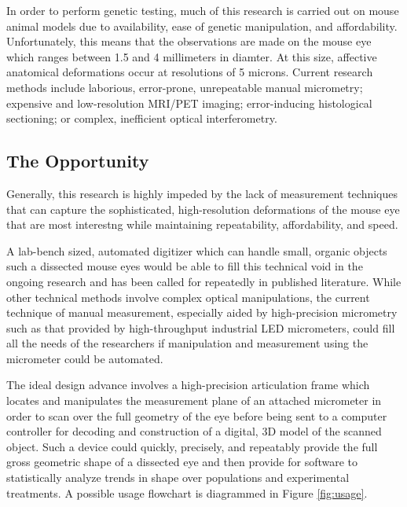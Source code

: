 \documentclass{article}
\begin{document}
In order to perform genetic testing, much of this research is carried
out on mouse animal models due to availability, ease of genetic
manipulation, and affordability\cite{schaeffel04}. Unfortunately, this
means that the observations are made on the mouse eye which ranges
between 1.5 and 4 millimeters in diamter. At this size, affective
anatomical deformations occur at resolutions of 5 microns. Current
research methods include laborious, error-prone, unrepeatable manual
micrometry\cite{wallman04}; expensive and low-resolution MRI/PET
imaging\cite{atchison04}; error-inducing histological
sectioning\cite{schaeffel04}; or complex, inefficient optical
interferometry\cite{schaeffel04,guggenheim04}.

\subsection{The Opportunity}
\label{sec:opportunity}

Generally, this research is highly impeded by the lack of measurement
techniques that can capture the sophisticated, high-resolution
deformations of the mouse eye that are most interestng while
maintaining repeatability, affordability, and speed.

A lab-bench sized, automated digitizer which can handle small, organic objects such a dissected mouse eyes would be able to fill this technical void in the ongoing research and has been called for repeatedly in published literature\cite{schaeffel04,atchison04,zhou99:genes,zhou99:models}. While other technical methods involve complex optical manipulations, the current technique of manual measurement, especially aided by high-precision micrometry such as that provided by high-throughput industrial LED micrometers, could fill all the needs of the researchers if manipulation and measurement using the micrometer could be automated.

The ideal design advance involves a high-precision articulation frame
which locates and manipulates the measurement plane of an attached
micrometer in order to scan over the full geometry of the eye before
being sent to a computer controller for decoding and construction of a
digital, 3D model of the scanned object. Such a device could quickly,
precisely, and repeatably provide the full gross geometric shape of a
dissected eye and then provide for software to statistically analyze
trends in shape over populations and experimental treatments. A possible usage flowchart is diagrammed in Figure \ref{fig:usage}.
\end{document}
